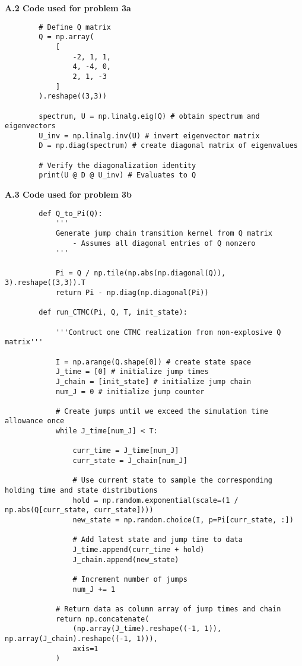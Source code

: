 \documentclass[11pt, letterpaper]{article}
\begin{document}
    {\bf A.2 Code used for problem 3a}
    \begin{verbatim}
        # Define Q matrix
        Q = np.array(
            [
                -2, 1, 1,
                4, -4, 0,
                2, 1, -3
            ]
        ).reshape((3,3))

        spectrum, U = np.linalg.eig(Q) # obtain spectrum and eigenvectors
        U_inv = np.linalg.inv(U) # invert eigenvector matrix
        D = np.diag(spectrum) # create diagonal matrix of eigenvalues

        # Verify the diagonalization identity
        print(U @ D @ U_inv) # Evaluates to Q
    \end{verbatim}
    {\bf A.3 Code used for problem 3b}
    \begin{verbatim}
        def Q_to_Pi(Q):
            '''
            Generate jump chain transition kernel from Q matrix
                - Assumes all diagonal entries of Q nonzero
            '''

            Pi = Q / np.tile(np.abs(np.diagonal(Q)), 3).reshape((3,3)).T
            return Pi - np.diag(np.diagonal(Pi))

        def run_CTMC(Pi, Q, T, init_state):

            '''Contruct one CTMC realization from non-explosive Q matrix'''

            I = np.arange(Q.shape[0]) # create state space
            J_time = [0] # initialize jump times
            J_chain = [init_state] # initialize jump chain
            num_J = 0 # initialize jump counter

            # Create jumps until we exceed the simulation time allowance once
            while J_time[num_J] < T: 

                curr_time = J_time[num_J] 
                curr_state = J_chain[num_J]

                # Use current state to sample the corresponding holding time and state distributions
                hold = np.random.exponential(scale=(1 / np.abs(Q[curr_state, curr_state])))
                new_state = np.random.choice(I, p=Pi[curr_state, :])

                # Add latest state and jump time to data
                J_time.append(curr_time + hold)
                J_chain.append(new_state)

                # Increment number of jumps
                num_J += 1

            # Return data as column array of jump times and chain
            return np.concatenate(
                (np.array(J_time).reshape((-1, 1)), np.array(J_chain).reshape((-1, 1))),
                axis=1
            )



\end{verbatim}
\end{document}
